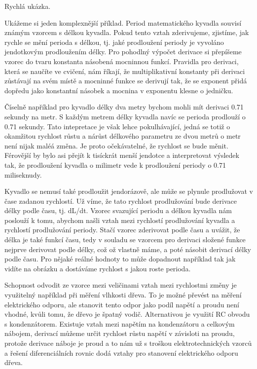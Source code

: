 \documentclass[12pt]{article}
\begin{document}
Rychlá ukázka.

Ukážeme si jeden komplexnější příklad. Period matematického kyvadla souvisí známým vzorcem s délkou kyvadla. Pokud tento vztah zderivujeme, zjistíme, jak rychle se mění perioda s délkou, tj. jaké prodloužení periody je vyvoláno jendotkovým prodloužením délky. Pro pohodlný výpočet derivace si přepíšeme vzorec do tvaru konstanta násobená mocninnou funkcí. Pravidla pro derivaci, která se naučíte ve cvičení, nám říkají, že multiplikativní konstanty při derivaci zůstávají na svém místě a mocninné funkce se derivují tak, že se exponent přidá dopředu jako konstantní násobek a mocnina v exponentu klesne o jedničku.

Číselně například pro kyvadlo délky dva metry bychom mohli mít derivaci 0.71 sekundy na metr. S každým metrem délky kyvadla navíc se perioda prodlouží o 0.71 sekundy. Tato intepretace je však lehce pokulhávající, jedná se totiž o okamžitou rychlost růstu a nárůst délkového parametru ze dvou metrů o metr není nijak maléá změna. Je proto očekávatelné, že rychlost se bude měnit. Férovější by bylo asi přejít k tisíckrát menší jendotce a interpretovat výsledek tak, že prodloužení kyvadla o milimetr vede k prodloužení periody o 0.71 miliseknudy.

Kyvadlo se nemusí také prodloužit jendorázově, ale může se plynule prodlužovat v čase zadanou rychlostí. Už víme, že tato rychlost prodlužování bude derivace délky podle času, tj. dL/dt. Vzorec svazující periodu a délkou kyvadla nám poslouží k tomu, abychom našli vztah mezi rychlostí prodlužování kyvadla a rychlostí prodlužování periody. Stačí vzorec zderivovat podle času a uvážit, že délka je také funkcí času, tedy v souladu se vzorcem pro derivaci složené funkce nejprve derivovat podle délky, což ož vlastně máme, a poté násobit derivací délky podle času. Pro nějaké reálné hodnoty to může dopadnout například tak jak vidíte na obrázku a dostáváme rychlost s jakou roste perioda.

Schopnost odvodit ze vzorce mezi veličinami vztah mezi rychlostmi změny je využitelný například při měření vlhkosti dřeva. To je možné převést na měření elektrického odporu, ale stanovit tento odpor jako podíl napětí a proudu není vhodné, kvůli tomu, že dřevo je špatný vodič. Alternativou je využití RC obvodu s kondenzátorem. Existuje vztah mezi napětím na kondenzátoru a celkovým nábojem, derivací můžeme určit rychlost růstu napětí v závisloti na proudu, protože derivace náboje je proud a to nám už s troškou elektrotechnických vzorců a řešení diferenciálních rovnic dodá vztahy pro stanovení elektrického odporu dřeva.
\end{document}
